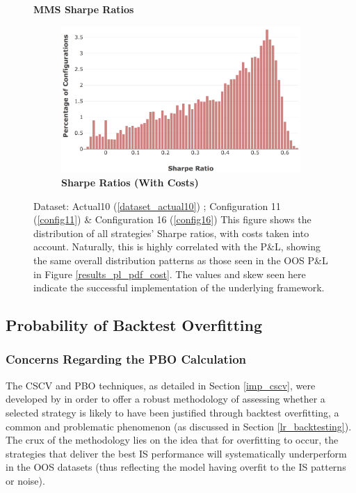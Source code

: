 \documentclass[a4paper,11pt,oneside]{article}
\theoremstyle{plain}
\theoremstyle{definition}
\begin{document}
	
	\begin{figure}[H]
		\centering
		\textbf{MMS Sharpe Ratios}
		\begin{subfigure}{.99\textwidth}
			\centering 
			\includegraphics[scale=0.35]{images/results/8_8_mms/sharpe_ratios.png} 
			\caption{\textbf{Sharpe Ratios (With Costs)}}
			\label{figure-sharpe_ratios}
		\end{subfigure}%
		\caption[MMS Sharpe Ratios]{Dataset: Actual10 (\ref{dataset_actual10}) ; Configuration 11 (\ref{config11}) \&  Configuration 16 (\ref{config16})
			\newline This figure shows the distribution of all strategies' Sharpe ratios, with costs taken into account. Naturally, this is highly correlated with the P\&L, showing the same overall distribution patterns as those seen in the OOS P\&L in Figure \ref{results_pl_pdf_cost}. The values and skew seen here indicate the successful implementation of the underlying framework.
		}
		\label{results_mms_sr_conf}
	\end{figure}

	\newpage

	\subsection{Probability of Backtest Overfitting}\label{results_pbo}
	
	
	\subsubsection{Concerns Regarding the PBO Calculation}\label{results_pboconcerns}
	
	The CSCV and PBO techniques, as detailed in Section \ref{imp_cscv}, were developed by \citet{BailyPBO} in order to offer a robust methodology of assessing whether a selected strategy is likely to have been justified through backtest overfitting, a common and problematic phenomenon (as discussed in Section \ref{lr_backtesting}). The crux of the methodology lies on the idea that for overfitting to occur, the strategies that deliver the best IS performance will systematically underperform in the OOS datasets (thus reflecting the model having overfit to the IS patterns or noise).\newline
	
\end{document}
